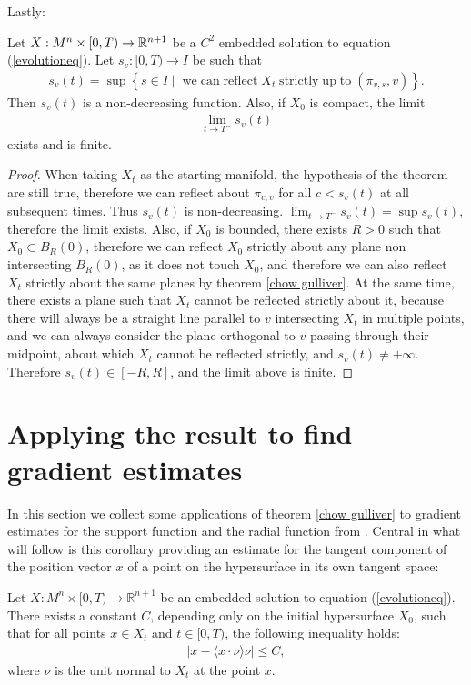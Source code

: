 Lastly: 
\begin{cor}
	Let $X:M^n\times [0,T) \rightarrow \mathbb{R}^{n+1}$ be a $C^2$ embedded solution to  equation (\ref{evolutioneq}). Let $s_v:[0,T) \rightarrow I$ be such that 
	\begin{align*}
		s_v(t)= \sup\left\{s \in I \;|\;  \; \mathrm{we \; can \; reflect \;} X_t \mathrm{ \; strictly \; up \; to }\; (\pi_{v, s}, v) \right\}.
	\end{align*}
	Then $s_v(t)$ is a non-decreasing function. Also, if $X_0$ is compact, the limit
	\begin{align*}
		\lim_{t\rightarrow T^-} s_v(t)
	\end{align*}
	exists and is finite.
\end{cor}
\begin{proof}
	When taking $X_t$ as the starting manifold, the hypothesis of the theorem are still true, therefore we can reflect about $\pi_{c, v}$  for all $c<s_v(t)$ at all subsequent times. Thus $s_v(t)$ is non-decreasing. $\lim_{t\rightarrow T^-} s_v(t) = \sup s_v(t)$, therefore the limit exists. Also, if $X_0$ is bounded, there exists $R>0$ such that $X_0\subset B_R(0)$, therefore we can reflect $X_0$ strictly about any plane non intersecting $B_R(0)$, as it does not touch $X_0$, and therefore we can also reflect $X_t$ strictly about the same planes by theorem \ref{chow gulliver}. At the same time, there exists a plane such that $X_t$ cannot be reflected strictly about it, because there will always be a straight line parallel to $v$ intersecting $X_t$ in multiple points, and we can always consider the plane orthogonal to $v$ passing through their midpoint, about which $X_t$ cannot be reflected strictly, and $s_v(t) \neq +\infty$. Therefore  $s_v(t)\in [-R, R]$, and the limit above is finite. 
\end{proof}


\section{Applying the result to find gradient estimates}

In this section we collect some applications of theorem \ref{chow gulliver} to gradient estimates for the support function and the radial function from \cite{Chow}. Central in what will follow is this corollary providing an estimate for the tangent component of the position vector $x$ of a point on the hypersurface in its own tangent space: 
\begin{cor}
	Let $ X : M^n \times [0, T) \to \mathbb{R}^{n+1} $ be an embedded solution to equation (\ref{evolutioneq}). There exists a constant $ C $, depending only on the initial hypersurface $ X_0 $, such that for all points $ x \in X_t $ and $ t \in [0, T) $, the following inequality holds:
	\begin{align*}
		| x - \langle x \cdot \nu\rangle \nu | \leq C,
	\end{align*}
	where $ \nu $ is the unit normal to $ X_t $ at the point $ x $.
	\label{x projection estimate}
\end{cor}


